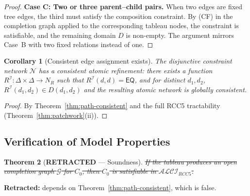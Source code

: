 \documentclass[a4paper,11pt]{article}
\newtheorem{theorem}{Theorem}[section]
\newtheorem{corollary}[theorem]{Corollary}
\theoremstyle{definition}
\newcommand{\ALCIRCC}[1]{\ensuremath{\mathcal{ALCI}_{\mathit{RCC#1}}}}
\newcommand{\NR}{\ensuremath{N_R}}
\newcommand{\interp}{\ensuremath{\mathcal{I}}}
\newcommand{\EQ}{\ensuremath{\mathsf{EQ}}}
\begin{document}
\begin{proof}
\medskip
\noindent\textbf{Case C: Two or three parent--child pairs.}\;
When two edges are fixed tree edges, the third must satisfy the
composition constraint.  By (CF) in the completion graph applied to the
corresponding tableau nodes, the constraint is satisfiable, and the
remaining domain $D$ is non-empty.  The argument mirrors Case~B with
two fixed relations instead of one.
\end{proof}

\begin{corollary}[Consistent edge assignment exists]
\label{cor:consistent-assignment}
The disjunctive constraint network $\mathcal{N}$ has a consistent
atomic refinement: there exists a function $R^{\interp} \colon \Delta
\times \Delta \to \NR$ such that $R^{\interp}(d, d) = \EQ$, and for
distinct $d_1, d_2$, $R^{\interp}(d_1, d_2) \in D(d_1, d_2)$ and the
resulting atomic network is globally consistent.
\end{corollary}

\begin{proof}
By Theorem~\ref{thm:path-consistent} and the full RCC5 tractability
(Theorem~\ref{thm:patchwork}(ii)).
\end{proof}

\subsection{Verification of Model Properties}

\begin{theorem}[\textbf{RETRACTED} --- Soundness]
\label{thm:soundness}
\sout{If the tableau produces an open completion graph $\mathcal{G}$ for
$C_0$, then $C_0$ is satisfiable in $\ALCIRCC{5}$.}
\end{theorem}

\noindent
\textbf{Retracted:} depends on Theorem~\ref{thm:path-consistent},
which is false.
\end{document}
